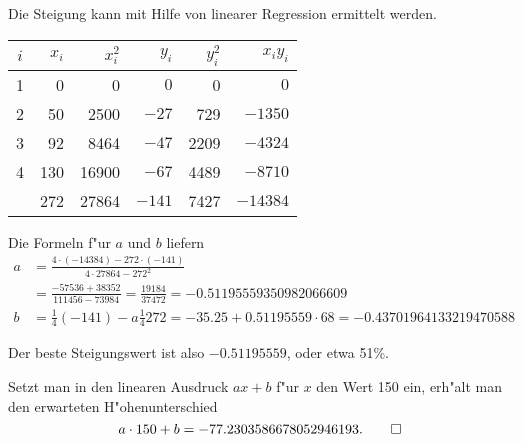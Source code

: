 \begin{loesung}
Die Steigung kann mit Hilfe von linearer Regression ermittelt werden.
\begin{center}
\begin{tabular}{|c|rr|rr|r|}
\hline
$i$&$x_i$&$x_i^2$&$y_i$&$y_i^2$&$x_iy_i$\\
\hline
1&  0&    0&$   0$&   0&$    0$\\
2& 50& 2500&$ -27$& 729&$ -1350$\\
3& 92& 8464&$ -47$&2209&$ -4324$\\
4&130&16900&$ -67$&4489&$ -8710$\\
\hline
 &272&27864&$-141$&7427&$-14384$\\
\hline
\end{tabular}
\end{center}
Die Formeln f"ur $a$ und $b$ liefern
\begin{align*}
a
&=\frac{4\cdot(-14384)-272\cdot (-141)}{4\cdot 27864 - 272^2}
\\
&=
\frac{-57536+38352}{111456-73984}
=
\frac{19184}{37472}=-0.51195559350982066609
\\
b
&=
\frac14(-141)-a\frac14272
=-35.25 + 0.51195559\cdot 68=-0.43701964133219470588
\end{align*}
\begin{teilaufgaben}
\item Der beste Steigungswert ist also $-0.51195559$, oder etwa 51\%.
\item Setzt man in den linearen Ausdruck $ax+b$ f"ur $x$ den Wert
150 ein, erh"alt man den erwarteten H"ohenunterschied
\[
a\cdot 150 + b= 
-77.2303586678052946193.
\qedhere
\]
\end{teilaufgaben}
\end{loesung}

